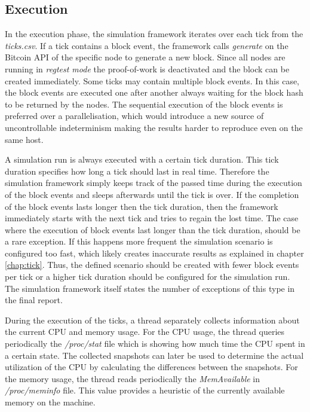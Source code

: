 \subsection{Execution}
\label{chap:simulation_execution}

In the execution phase, the simulation framework iterates over each tick from the \textit{ticks.csv}.
If a tick contains a block event, the framework calls \textit{generate} on the Bitcoin API of the specific node to generate a new block.
Since all nodes are running in \textit{regtest mode} the proof-of-work is deactivated and the block can be created immediately.
Some ticks may contain multiple block events.
In this case, the block events are executed one after another always waiting for the block hash to be returned by the nodes.
The sequential execution of the block events is preferred over a parallelisation, which would introduce a new source of uncontrollable indeterminism making the results harder to reproduce even on the same host.

A simulation run is always executed with a certain tick duration.
This tick duration specifies how long a tick should last in real time.
Therefore the simulation framework simply keeps track of the passed time during the execution of the block events and sleeps afterwards until the tick is over.
If the completion of the block events lasts longer then the tick duration, then the framework immediately starts with the next tick and tries to regain the lost time.
The case where the execution of block events last longer than the tick duration, should be a rare exception.
If this happens more frequent the simulation scenario is configured too fast, which likely creates inaccurate results as explained in chapter \ref{chap:tick}.
Thus, the defined scenario should be created with fewer block events per tick or a higher tick duration should be configured for the simulation run.
The simulation framework itself states the number of exceptions of this type in the final report.

During the execution of the ticks, a thread separately collects information about the current CPU and memory usage.
For the CPU usage, the thread queries periodically the \textit{/proc/stat} file which is showing how much time the CPU spent in a certain state. 
The collected snapshots can later be used to determine the actual utilization of the CPU by calculating the differences between the snapshots.
For the memory usage, the thread reads periodically the \textit{MemAvailable} in \textit{/proc/meminfo} file.
This value provides a heuristic of the currently available memory on the machine.

